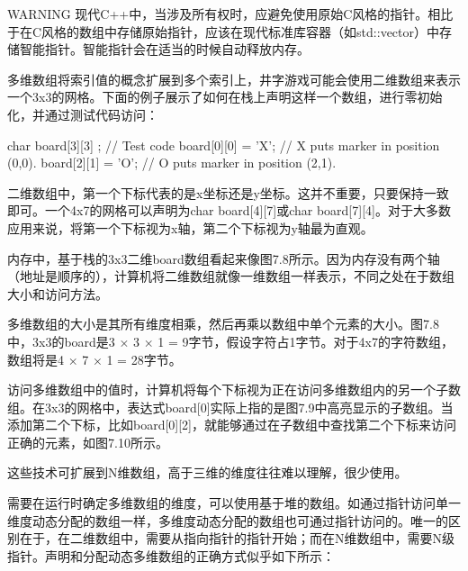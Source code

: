 \begin{myWarning}{WARNING}
现代C++中，当涉及所有权时，应避免使用原始C风格的指针。相比于在C风格的数组中存储原始指针，应该在现代标准库容器（如std::vector）中存储智能指针。智能指针会在适当的时候自动释放内存。
\end{myWarning}


多维数组将索引值的概念扩展到多个索引上，井字游戏可能会使用二维数组来表示一个3x3的网格。下面的例子展示了如何在栈上声明这样一个数组，进行零初始化，并通过测试代码访问：

\begin{cpp}
char board[3][3] {};
// Test code
board[0][0] = 'X'; // X puts marker in position (0,0).
board[2][1] = 'O'; // O puts marker in position (2,1).
\end{cpp}

二维数组中，第一个下标代表的是x坐标还是y坐标。这并不重要，只要保持一致即可。一个4x7的网格可以声明为char board[4][7]或char board[7][4]。对于大多数应用来说，将第一个下标视为x轴，第二个下标视为y轴最为直观。


内存中，基于栈的3x3二维board数组看起来像图7.8所示。因为内存没有两个轴（地址是顺序的），计算机将二维数组就像一维数组一样表示，不同之处在于数组大小和访问方法。


多维数组的大小是其所有维度相乘，然后再乘以数组中单个元素的大小。图7.8中，3x3的board是3 × 3 × 1 = 9字节，假设字符占1字节。对于4x7的字符数组，数组将是4 × 7 × 1 = 28字节。

访问多维数组中的值时，计算机将每个下标视为正在访问多维数组内的另一个子数组。在3x3的网格中，表达式board[0]实际上指的是图7.9中高亮显示的子数组。当添加第二个下标，比如board[0][2]，就能够通过在子数组中查找第二个下标来访问正确的元素，如图7.10所示。

这些技术可扩展到N维数组，高于三维的维度往往难以理解，很少使用。




需要在运行时确定多维数组的维度，可以使用基于堆的数组。如通过指针访问单一维度动态分配的数组一样，多维度动态分配的数组也可通过指针访问的。唯一的区别在于，在二维数组中，需要从指向指针的指针开始；而在N维数组中，需要N级指针。声明和分配动态多维数组的正确方式似乎如下所示：

